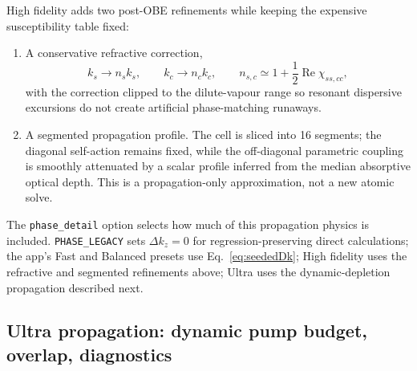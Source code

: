 \documentclass[11pt]{article}
\newcommand{\code}[1]{\texttt{#1}}
\DeclareMathOperator{\Real}{Re}
\begin{document}
High fidelity adds two post-OBE refinements while keeping the expensive
susceptibility table fixed:
\begin{enumerate}[leftmargin=2.2em]
  \item A conservative refractive correction,
  \[
  k_s\to n_s k_s,\qquad k_c\to n_c k_c,\qquad
  n_{s,c}\simeq1+\frac{1}{2}\Real\chi_{ss,cc},
  \]
  with the correction clipped to the dilute-vapour range so resonant dispersive
  excursions do not create artificial phase-matching runaways.
  \item A segmented propagation profile. The cell is sliced into 16 segments; the
  diagonal self-action remains fixed, while the off-diagonal parametric coupling
  is smoothly attenuated by a scalar profile inferred from the median absorptive
  optical depth. This is a propagation-only approximation, not a new atomic solve.
\end{enumerate}

The \code{phase\_detail} option selects how much of this propagation physics is
included. \code{PHASE\_LEGACY} sets $\Delta k_z=0$ for regression-preserving
direct calculations; the app's Fast and Balanced presets use
Eq.~\eqref{eq:seededDk}; High fidelity uses the refractive and segmented
refinements above; Ultra uses the dynamic-depletion propagation described next.

\subsection{Ultra propagation: dynamic pump budget, overlap, diagnostics}
\label{sec:ultraprop}
\end{document}
